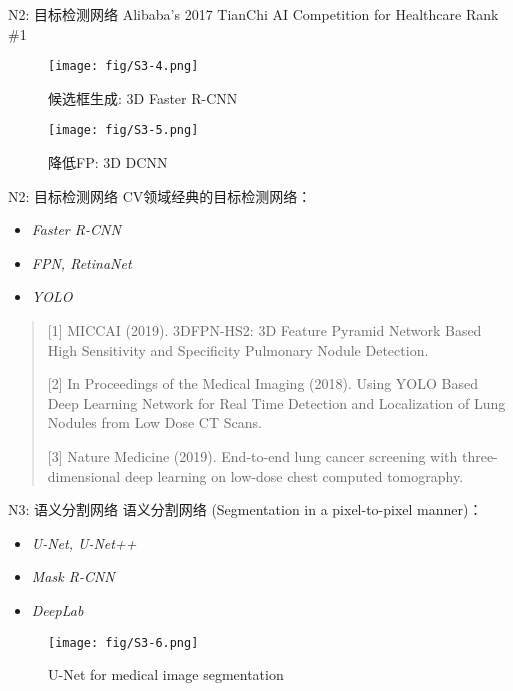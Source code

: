 \documentclass[10pt]{beamer}
\begin{document}
\begin{frame}{N2: 目标检测网络}
  Alibaba’s 2017 TianChi AI Competition for Healthcare Rank \#1

  \begin{figure}[H]
    \centering
    \texttt{[image: fig/S3-4.png]}
    \caption{候选框生成: 3D Faster R-CNN}
  \end{figure}
  \begin{figure}[H]
    \centering
    \texttt{[image: fig/S3-5.png]}
    \caption{降低FP: 3D DCNN}
  \end{figure}
\end{frame}

\begin{frame}{N2: 目标检测网络}
  CV领域经典的目标检测网络：
  \begin{itemize}
    \item \textit{Faster R-CNN}
    \item \textit{FPN, RetinaNet}
    \item \textit{YOLO}
  \end{itemize}
  \vspace{5 mm}
  \begin{quote}
    [1] MICCAI (2019). 3DFPN-HS2: 3D Feature Pyramid Network Based High Sensitivity and Specificity Pulmonary Nodule Detection. 

    [2] In Proceedings of the Medical Imaging (2018). Using YOLO Based Deep Learning Network for Real Time Detection and Localization of Lung Nodules from Low Dose CT Scans.

    [3] Nature Medicine (2019). End-to-end lung cancer screening with three-dimensional deep learning on low-dose chest computed tomography. 
  \end{quote}
\end{frame}

\begin{frame}{N3: 语义分割网络}
  语义分割网络 (Segmentation in a pixel-to-pixel manner)：
  \begin{itemize}
    \item \textit{U-Net, U-Net++}
    \item \textit{Mask R-CNN}
    \item \textit{DeepLab}
  \end{itemize}

  \begin{figure}
    \centering
    \texttt{[image: fig/S3-6.png]}
    \caption{U-Net for medical image segmentation}
  \end{figure}
\end{frame}
\end{document}

